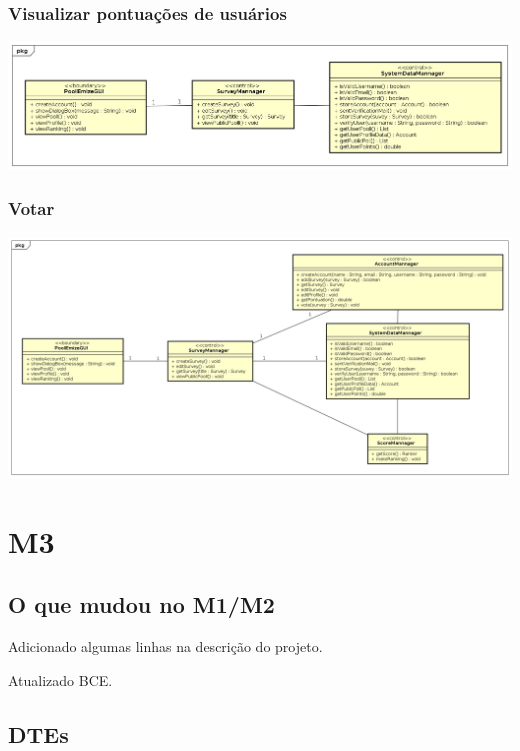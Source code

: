 \documentclass[a4paper,12pt]{report}
\begin{document}
\subsection*{Visualizar pontuações de usuários}
\markright{}
\includegraphics[width=14.3cm]{class_diagrams/ProjectClassDiagramVisualizarEnquetes.png}

\subsection*{Votar}
\markright{}
\includegraphics[width=14.3cm]{class_diagrams/ProjectClassDiagramVotar.png}

\chapter*{M3}
\markright{}
\section*{O que mudou no M1/M2}
\markright{}
\par Adicionado algumas linhas na descrição do projeto.
\par Atualizado BCE.

\section*{DTEs}
\markright{}
\end{document}

